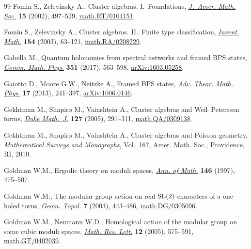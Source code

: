 \documentclass[10pt,a4paper]{amsart}
\numberwithin{equation}{section}
\begin{document}
\begin{thebibliography}{99}
Fomin S., Zelevinsky A., Cluster algebras. {I}.~{F}oundations, \href{https://doi.org/10.1090/S0894-0347-01-00385-X}{\textit{J.~Amer.
 Math. Soc.}} \textbf{15} (2002), 497--529, \href{https://arxiv.org/abs/math.RT/0104151}{math.RT/0104151}.

Fomin S., Zelevinsky A., Cluster algebras. {II}.~{F}inite type classification,
 \href{https://doi.org/10.1007/s00222-003-0302-y}{\textit{Invent. Math.}} \textbf{154} (2003), 63--121,
 \href{https://arxiv.org/abs/math.RA/0208229}{math.RA/0208229}.

Gabella M., Quantum holonomies from spectral networks and framed {BPS} states,
 \href{https://doi.org/10.1007/s00220-016-2729-1}{\textit{Comm. Math. Phys.}} \textbf{351} (2017), 563--598,
 \href{https://arxiv.org/abs/1603.05258}{arXiv:1603.05258}.

Gaiotto D., Moore G.W., Neitzke A., Framed {BPS} states, \href{https://doi.org/10.4310/ATMP.2013.v17.n2.a1}{\textit{Adv. Theor.
 Math. Phys.}} \textbf{17} (2013), 241--397, \href{https://arxiv.org/abs/1006.0146}{arXiv:1006.0146}.

Gekhtman M., Shapiro M., Vainshtein A., Cluster algebras and
 {W}eil--{P}etersson forms, \href{https://doi.org/10.1215/S0012-7094-04-12723-X}{\textit{Duke Math.~J.}} \textbf{127} (2005),
 291--311, \href{https://arxiv.org/abs/math.QA/0309138}{math.QA/0309138}.

Gekhtman M., Shapiro M., Vainshtein A., Cluster algebras and {P}oisson
 geometry, \href{https://doi.org/10.1090/surv/167}{\textit{Mathematical Surveys and Monographs}}, Vol.~167, Amer. Math.
 Soc., Providence, RI, 2010.

Goldman W.M., Ergodic theory on moduli spaces, \href{https://doi.org/10.2307/2952454}{\textit{Ann. of Math.}}
 \textbf{146} (1997), 475--507.

Goldman W.M., The modular group action on real {${\rm SL}(2)$}-characters of a
 one-holed torus, \href{https://doi.org/10.2140/gt.2003.7.443}{\textit{Geom. Topol.}} \textbf{7} (2003), 443--486,
 \href{https://arxiv.org/abs/math.DG/0305096}{math.DG/0305096}.

Goldman W.M., Neumann W.D., Homological action of the modular group on some
 cubic moduli spaces, \href{https://doi.org/10.4310/MRL.2005.v12.n4.a11}{\textit{Math. Res. Lett.}} \textbf{12} (2005), 575--591,
 \href{https://arxiv.org/abs/math.GT/0402039}{math.GT/0402039}.


\end{thebibliography}
\end{document}
